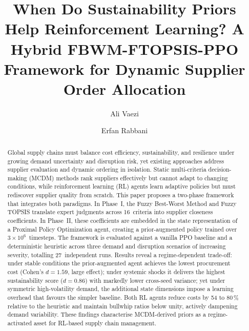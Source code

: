 \title{When Do Sustainability Priors Help Reinforcement Learning? A Hybrid FBWM-FTOPSIS-PPO Framework for Dynamic Supplier Order Allocation}

\author[inst1]{Ali Vaezi}

\author[inst2]{Erfan Rabbani}

{}


\begin{abstract}
Global supply chains must balance cost efficiency, sustainability, and resilience under growing demand uncertainty and disruption risk, yet existing approaches address supplier evaluation and dynamic ordering in isolation.
Static multi-criteria decision-making (MCDM) methods rank suppliers effectively but cannot adapt to changing conditions, while reinforcement learning (RL) agents learn adaptive policies but must rediscover supplier quality from scratch.
This paper proposes a two-phase framework that integrates both paradigms.
In Phase~I, the Fuzzy Best-Worst Method and Fuzzy TOPSIS translate expert judgments across 16~criteria into supplier closeness coefficients.
In Phase~II, these coefficients are embedded in the state representation of a Proximal Policy Optimization agent, creating a prior-augmented policy trained over $3\!\times\!10^{6}$~timesteps.
The framework is evaluated against a vanilla PPO baseline and a deterministic heuristic across three demand and disruption scenarios of increasing severity, totalling 27~independent runs.
Results reveal a regime-dependent trade-off: under stable conditions the prior-augmented agent achieves the lowest procurement cost (Cohen's $d = 1.59$, large effect); under systemic shocks it delivers the highest sustainability score ($d = 0.86$) with markedly lower cross-seed variance; yet under symmetric high-volatility demand, the additional state dimensions impose a learning overhead that favours the simpler baseline.
Both RL agents reduce costs by 54 to 80\,\% relative to the heuristic and maintain bullwhip ratios below unity, actively dampening demand variability.
These findings characterise MCDM-derived priors as a regime-activated asset for RL-based supply chain management.
\end{abstract}

